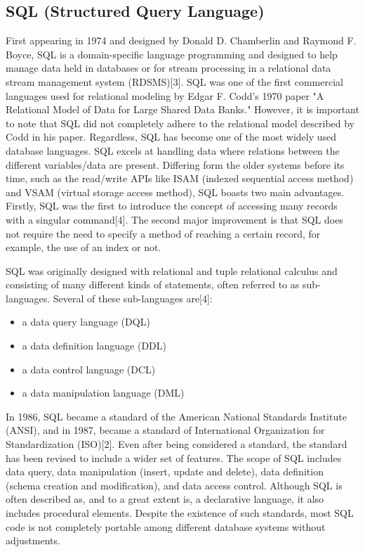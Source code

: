 \documentclass[letterpaper, 10 pt, conference]{ieeeconf}
\begin{document}
\subsection{SQL (Structured Query Language)} 
First appearing in 1974 and designed by Donald D. Chamberlin and Raymond F. Boyce, SQL is a domain-specific language programming and designed to help manage data held in databases or for stream processing in a relational data stream management system (RDSMS)[3]. SQL was one of the first commercial languages used for relational modeling by Edgar F. Codd's 1970 paper "A Relational Model of Data for Large Shared Data Banks." However, it is important to note that SQL did not completely adhere to the relational model described by Codd in his paper. Regardless, SQL has become one of the most widely used database languages. SQL excels at handling data where relations between the different variables/data are present. Differing form the older systems before its time, such as the read/write APIs like ISAM (indexed sequential access method) and VSAM (virtual storage access method), SQL boasts two main advantages. Firstly, SQL was the first to introduce the concept of accessing many records with a singular command[4]. The second major improvement is that SQL does not require the need to specify a method of reaching a certain record, for example, the use of an index or not.


SQL was originally designed with relational and tuple relational calculus and consisting of many different kinds of statements, often referred to as sub-languages. Several of these sub-languages are[4]:  
\begin{itemize}
    \item a data query language (DQL)
    \item a data definition language (DDL)
    \item a data control language (DCL)
    \item a data manipulation language (DML)
\end{itemize}


In 1986, SQL became a standard of the American National Standards Institute (ANSI), and in 1987, became a standard of International Organization for Standardization (ISO)[2]. Even after being considered a standard, the standard has been revised to include a wider set of features. The scope of SQL includes data query, data manipulation (insert, update and delete), data definition (schema creation and modification), and data access control. Although SQL is often described as, and to a great extent is, a declarative language, it also includes procedural elements. Despite the existence of such standards, most SQL code is not completely portable among different database systems without adjustments.
\end{document}
